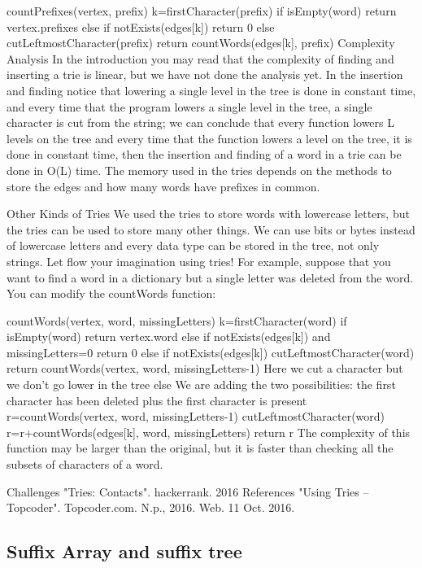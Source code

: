 countPrefixes(vertex, prefix)
    k=firstCharacter(prefix)
    if isEmpty(word)
        return vertex.prefixes
    else if notExists(edges[k])
        return 0
    else
        cutLeftmostCharacter(prefix)
        return countWords(edges[k], prefix)
Complexity Analysis
In the introduction you may read that the complexity of finding and inserting a trie is linear, but we have not done the analysis yet. In the insertion and finding notice that lowering a single level in the tree is done in constant time, and every time that the program lowers a single level in the tree, a single character is cut from the string; we can conclude that every function lowers L levels on the tree and every time that the function lowers a level on the tree, it is done in constant time, then the insertion and finding of a word in a trie can be done in O(L) time. The memory used in the tries depends on the methods to store the edges and how many words have prefixes in common.

Other Kinds of Tries
We used the tries to store words with lowercase letters, but the tries can be used to store many other things. We can use bits or bytes instead of lowercase letters and every data type can be stored in the tree, not only strings. Let flow your imagination using tries! For example, suppose that you want to find a word in a dictionary but a single letter was deleted from the word. You can modify the countWords function:

countWords(vertex, word, missingLetters)
    k=firstCharacter(word)
    if isEmpty(word)
        return vertex.word
    else if notExists(edges[k]) and missingLetters=0
        return 0
    else if notExists(edges[k])
        cutLeftmostCharacter(word)
        return countWords(vertex, word, missingLetters-1)
        Here we cut a character but we don't go lower in the tree
    else
        We are adding the two possibilities: the first
        character has been deleted plus the first character is present
        r=countWords(vertex, word, missingLetters-1)
        cutLeftmostCharacter(word)
        r=r+countWords(edges[k], word, missingLetters)
        return r
The complexity of this function may be larger than the original, but it is faster than checking all the subsets of characters of a word.

Challenges
"Tries: Contacts". hackerrank. 2016
References
"Using Tries – Topcoder". Topcoder.com. N.p., 2016. Web. 11 Oct. 2016.

\subsection{Suffix Array and suffix tree}

